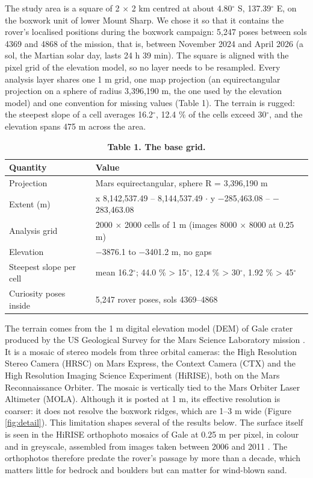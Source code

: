 \documentclass[11pt,a4paper]{article}
\begin{document}
The study area is a square of 2 $\times$ 2 km centred at about 4.80$^\circ$ S, 137.39$^\circ$ E, on the boxwork unit of lower Mount Sharp. We chose it so that it contains the rover's localised positions during the boxwork campaign: 5,247 poses between sols 4369 and 4868 of the mission, that is, between November 2024 and April 2026 (a sol, the Martian solar day, lasts 24 h 39 min). The square is aligned with the pixel grid of the elevation model, so no layer needs to be resampled. Every analysis layer shares one 1 m grid, one map projection (an equirectangular projection on a sphere of radius 3,396,190 m, the one used by the elevation model) and one convention for missing values (Table 1). The terrain is rugged: the steepest slope of a cell averages 16.2$^\circ$, 12.4 \% of the cells exceed 30$^\circ$, and the elevation spans 475 m across the area.

\begin{table}[H]
\centering\small
\caption{\textbf{Table 1. The base grid.}}
\begin{tabular}{ll}
\toprule
Quantity & Value \\
\midrule
Projection & Mars equirectangular, sphere R = 3,396,190 m \\
Extent (m) & x 8,142,537.49 -- 8,144,537.49 $\cdot$ y $-$285,463.08 -- $-$283,463.08 \\
Analysis grid & 2000 $\times$ 2000 cells of 1 m (images 8000 $\times$ 8000 at 0.25 m) \\
Elevation & $-$3876.1 to $-$3401.2 m, no gaps \\
Steepest slope per cell & mean 16.2$^\circ$; 44.0 \% > 15$^\circ$, 12.4 \% > 30$^\circ$, 1.92 \% > 45$^\circ$ \\
Curiosity poses inside & 5,247 rover poses, sols 4369--4868 \\
\bottomrule
\end{tabular}
\end{table}

The terrain comes from the 1 m digital elevation model (DEM) of Gale crater produced by the US Geological Survey for the Mars Science Laboratory mission \cite{Parker2016}. It is a mosaic of stereo models from three orbital cameras: the High Resolution Stereo Camera (HRSC) on Mars Express, the Context Camera (CTX) and the High Resolution Imaging Science Experiment (HiRISE), both on the Mars Reconnaissance Orbiter. The mosaic is vertically tied to the Mars Orbiter Laser Altimeter (MOLA). Although it is posted at 1 m, its effective resolution is coarser: it does not resolve the boxwork ridges, which are 1--3 m wide (Figure \ref{fig:detail}). This limitation shapes several of the results below. The surface itself is seen in the HiRISE orthophoto mosaics of Gale at 0.25 m per pixel, in colour and in greyscale, assembled from images taken between 2006 and 2011 \cite{HiRISE-Gale}. The orthophotos therefore predate the rover's passage by more than a decade, which matters little for bedrock and boulders but can matter for wind-blown sand.
\end{document}
